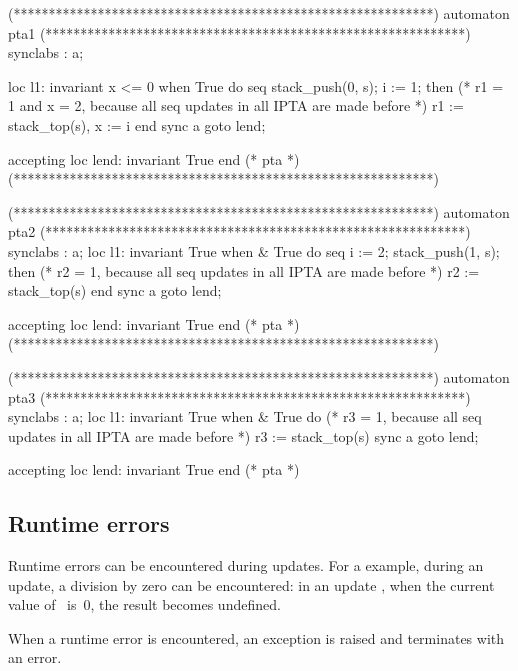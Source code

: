 \begin{IMITATORmodel}
(************************************************************)
automaton pta1
(************************************************************)
	synclabs : a;

	loc l1: invariant x <= 0
	when True
	do {
		seq
			stack_push(0, s);
			i := 1;
		then
			(* r1 = 1 and x = 2, because all seq updates in all IPTA are made before *)
			r1 := stack_top(s),
			x := i
		end
	}
	sync a goto lend;

	accepting loc lend: invariant True
	end (* pta *)
	(************************************************************)

	(************************************************************)
	automaton pta2
	(************************************************************)
	synclabs : a;
	loc l1: invariant True
	when
	& True
	do {
		seq
			i := 2;
			stack_push(1, s);
		then
			(* r2 = 1, because all seq updates in all IPTA are made before *)
			r2 := stack_top(s)
		end
	}
	sync a goto lend;

	accepting loc lend: invariant True
	end (* pta *)
	(************************************************************)

	(************************************************************)
	automaton pta3
	(************************************************************)
	synclabs : a;
	loc l1: invariant True
	when
	& True
	do {
		(* r3 = 1, because all seq updates in all IPTA are made before *)
		r3 := stack_top(s)
	}
	sync a goto lend;

	accepting loc lend: invariant True
	end (* pta *)
\end{IMITATORmodel}


\subsection{Runtime errors}\label{ss:runtime-errors}

Runtime errors can be encountered during updates.
For a example, during an update, a division by zero can be encountered: in an update , when the current value of~ is~0, the result becomes undefined.

When a runtime error is encountered, an exception is raised and \imitator{} terminates with an error.

